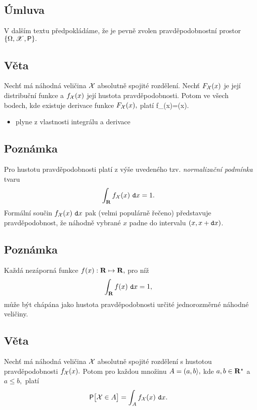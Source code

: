 \subsection{\'Umluva}

V dal\v s\'im textu p\v redpokl\'ad\'ame, \v ze je pevn\v e zvolen pravd\v epodobnostn\'i prostor $\{\Omega,\mathscr{X},\mbox{\sf P}\}.$

\subsection{V\v eta}

Nech\v t m\'a n\'ahodn\'a veli\v cina ${\mathcal X}$ absolutn\v e spojit\'e rozd\v elen\'i. Nech\v t $F_{\mathcal X}(x)$ je jej\'i distribu\v cn\'i funkce a $f_{\mathcal X}(x)$ jej\'i hustota pravd\v epodobnosti. Potom ve v\v sech bodech, kde existuje derivace funkce $F_{\mathcal X}(x),$ plat\'i \BE f_\X(x)=(x).\label{ReasonWasYou}\EE

\Proof

\begin{itemize}
\item plyne z vlastnosti integr\'alu a derivace
\end{itemize}

\subsection{Poznámka}
Pro hustotu pravděpodobnosti platí z v\'y\v se uveden\'eho tzv.
\emph{normaliza\v cn\'i podm\'inka} tvaru $$\int_{{\mathbf R}} f_{\mathcal X}(x)~\mathtt{d}x = 1.$$
Form\'aln\'i součin $f_{\mathcal X}(x)~\mathtt{d}x$ pak (velmi popul\'arn\v e \v re\v ceno) představuje
pravděpodobnost, že náhodně vybran\'e $x$ padne do intervalu $(x,
x+\mathtt{d}x)$.

\subsection{Poznámka}

Ka\v zd\'a nez\'aporn\'a funkce $f(x):{\mathbf R}\mapsto{\mathbf R},$ pro n\'i\v z
%
$$\int_{\mathbf R} f(x)~\mathtt{d}x = 1,$$
%
m\r u\v ze b\'yt ch\'ap\'ana jako hustota pravd\v epodobnosti ur\v
cit\'e jednorozm\v ern\'e n\'ahodn\'e veli\v ciny.

\subsection{V\v eta}

Nech\v t m\'a n\'ahodn\'a veli\v cina ${\mathcal X}$ absolutn\v e spojit\'e rozd\v elen\'i s hustotou pravd\v epodobnosti $f_{\mathcal X}(x).$ Potom pro ka\v zdou mno\v zinu $A=(a,b\rangle,$ kde $a,b\in{\mathbf R}^\star$ a $a \leq b,$ plat\'i $$\mbox{\sf P}\bigl[{\mathcal X}\in A\bigr]=\int_A f_{\mathcal X}(x)~\mathtt{d}x.$$

